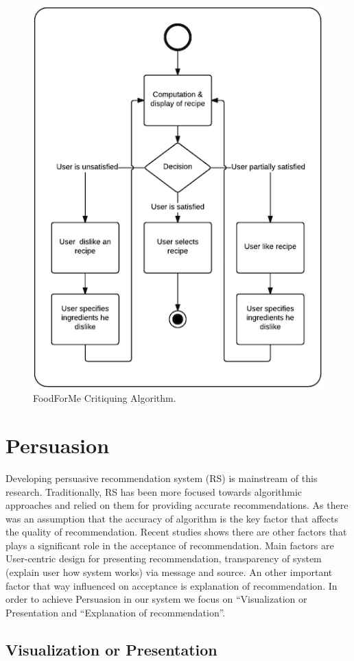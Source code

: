 	  \begin{figure}[h]
	  	\centering
	  	\includegraphics[width=.6\linewidth]{figures/ch3_critique_algo.png}
	  	\caption{FoodForMe Critiquing Algorithm.}
	  	\label{fig:ch3_critique_algo}
	  \end{figure}
	  
\newpage	  
\section{Persuasion} \label{ch4_persuasion}

Developing persuasive recommendation system (RS) is mainstream of this research. Traditionally, RS has been more focused towards algorithmic approaches and relied on them for providing accurate recommendations. As there was an assumption that the accuracy of algorithm is the key factor that affects the quality of recommendation. Recent studies shows there are other factors that plays a significant role in the acceptance of recommendation. Main factors are User-centric design for presenting recommendation, transparency of system (explain user how system works) via message and source. An other important factor that way influenced on acceptance is explanation of recommendation\cite{gkika2014persuasive}. In order to achieve Persuasion in our system we focus on   “Visualization or Presentation \cite{nanou2010effects} \cite{pu2006trust} and “Explanation of recommendation\cite{cialdini2009influence}\cite{fogg1998persuasive}”.
  
\subsection{Visualization or Presentation} 

